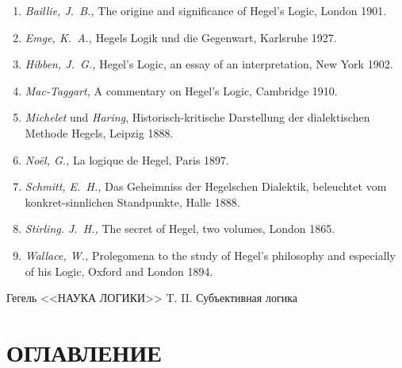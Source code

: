 \begin{enumerate}
\item{\em Baillie, J.~B.,} The origine and significance of Hegel's Logic,
London 1901.
\item{\em Emge, K.~A.,} Hegels Logik und die Gegenwart, Karlsruhe 1927.
\item{\em Hibben, J.~G.,} Hegel's Logic, an essay of an interpretation,
New York 1902.
\item{\em Mac-Taggart,} A commentary on Hegel's Logic, Cambridge 1910.
\item{\em Michelet} und {\em Haring}, Historisch-kritische Darstellung
der dialektischen Methode Hegels, Leipzig 1888.
\item{\em Noël, G.,} La logique de Hegel, Paris 1897.
\item{\em Schmitt, E.~H.,} Das Geheimniss der Hegelschen Dialektik, beleuchtet
vom konkret-sinnlichen Standpunkte, Halle 1888.
\item{\em Stirling. J.~H.,} The secret of Hegel, two volumes, London 1865.
\item{\em Wallace, W.,} Prolegomena to the study of Hegel's philosophy and
especially of his Logic, Oxford and London 1894.
\end{enumerate}

\clearpage
\bigskip
\printpagenotes
\bigskip
\bigskip

{\centering Гегель <<НАУКА ЛОГИКИ>> T. II. Субъективная логика \par}

\renewcommand\contentsname{}
\section*[Оглавление]{ОГЛАВЛЕНИЕ}
\tableofcontents

\bigskip
\clearpage
\bigskip

